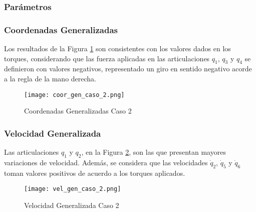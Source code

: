     \subsubsection{Parámetros} 
    \begin{table}[H]%
        \centering
        \begin{center}
        \caption{Parámetros modificados del simulador} 
        \centering
        \end{center}
        \label{ref:TablaC2}
    \end{table}

    \subsubsection{Coordenadas Generalizadas}
    \noindent Los resultados de la Figura \ref{fig:CoordGenC2} son consistentes con los 
    valores dados en los torques, considerando que las fuerza aplicadas en las 
    articulaciones $q_1$, $q_3$ y $q_4$ se definieron con valores negativos,
    representado un giro en sentido negativo acorde a la regla 
    de la mano derecha.

    \begin{figure} [H]%
            \centering
            \texttt{[image: coor\_gen\_caso\_2.png]} 
        \caption{Coordenadas Generalizadas Caso 2}
        \label{fig:CoordGenC2}
    \end{figure}

    \subsubsection{Velocidad Generalizada}
    \noindent Las articulaciones $q_1$ y $q_2$, en la Figura \ref{fig:VelGenC2}, 
    son las que presentan mayores variaciones de velocidad.
    Además, se considera que las velocidades $\dot{q}_2$, $\dot{q}_5$ y 
    $\dot{q}_6$ toman valores positivos de acuerdo a los torques aplicados.
    \begin{figure}[H]%
            \centering
            \texttt{[image: vel\_gen\_caso\_2.png]} 
        \caption{Velocidad Generalizada Caso 2}
        \label{fig:VelGenC2}
    \end{figure}

